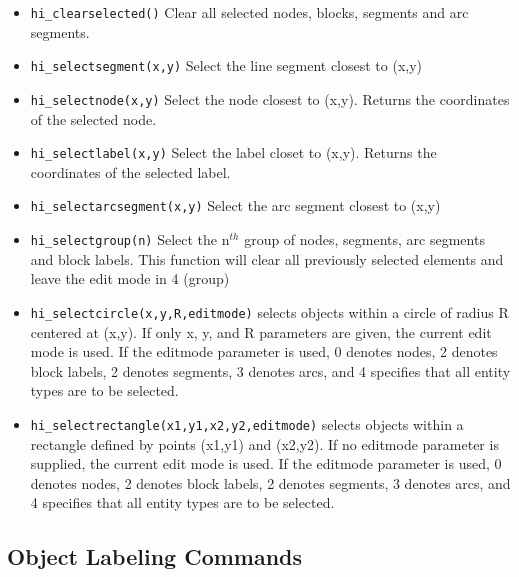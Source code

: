 \begin{itemize}
\item {\tt hi\_clearselected()} Clear all selected nodes, blocks, segments and arc
segments.

\item {\tt hi\_selectsegment(x,y)} Select the line segment closest to (x,y)

\item {\tt hi\_selectnode(x,y)} Select the node closest to (x,y).
Returns the coordinates of the selected node.

\item {\tt hi\_selectlabel(x,y)} Select the label closet to (x,y).
Returns the coordinates of the selected label.

\item {\tt hi\_selectarcsegment(x,y)} Select the arc segment closest to (x,y)

\item {\tt hi\_selectgroup(n)} Select the n$^{th}$ group of nodes, segments, arc
segments and block labels. This function will clear all previously selected
elements and leave the edit mode in 4 (group)

\item{\tt hi\_selectcircle(x,y,R,editmode)} selects objects within a circle of radius
R centered at (x,y).  If only x, y, and R parameters are given, the current
edit mode is used.  If the editmode parameter is used, 0 denotes nodes, 2
denotes block labels, 2 denotes segments, 3 denotes arcs, and 4 specifies
that all entity types are to be selected.

\item{\tt hi\_selectrectangle(x1,y1,x2,y2,editmode)} selects objects within a rectangle
defined by points (x1,y1) and (x2,y2). If no editmode parameter is supplied,
the current edit mode is used.  If the editmode parameter is used, 0 denotes
nodes, 2 denotes block labels, 2 denotes segments, 3 denotes arcs, and 4
specifies that all entity types are to be selected.
\end{itemize}


\subsection{Object Labeling Commands}

